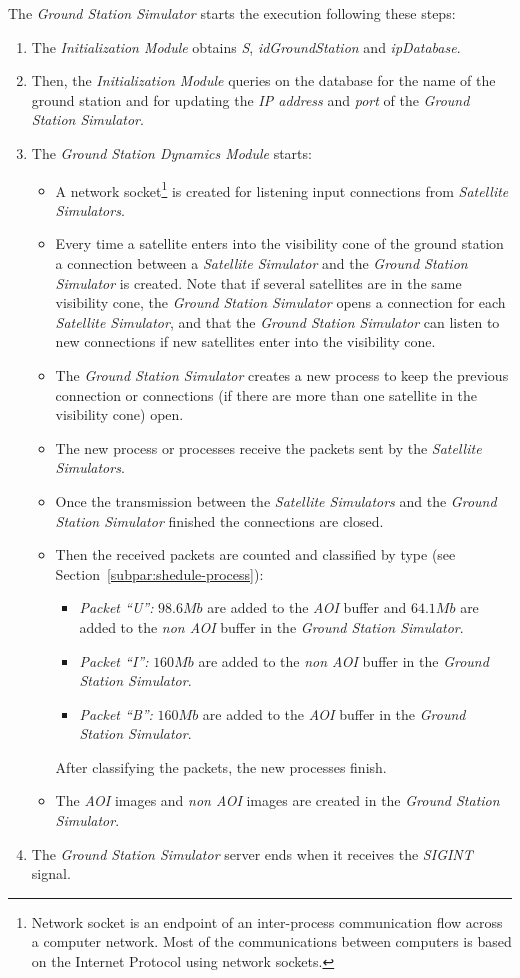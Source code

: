The \emph{Ground Station Simulator} starts the execution following these steps:
\begin{enumerate}
\item The \emph{Initialization Module} obtains \emph{S}, \emph{idGroundStation} and \emph{ipDatabase}.
\item Then, the \emph{Initialization Module} queries on the database for the
  name of the ground station and for updating the \emph{IP address} and
  \emph{port} of the \emph{Ground Station Simulator}.
\item The \emph{Ground Station Dynamics Module} starts:
\begin{itemize}
\item A network socket\footnote{Network socket is an endpoint of an inter-process communication flow across a computer network. Most of the communications between computers is based on the Internet Protocol using network sockets.}  is created for listening input connections from \emph{Satellite Simulators}.
\item Every time a satellite enters into the visibility cone of the ground station a connection between a \emph{Satellite Simulator} and the \emph{Ground Station Simulator} is created. Note that if several satellites are in the same visibility cone, the \emph{Ground Station Simulator} opens a connection for each \emph{Satellite Simulator}, and that the \emph{Ground Station Simulator} can listen to new connections if new satellites enter into the visibility cone.
\item The \emph{Ground Station Simulator} creates a new process to keep the previous connection or connections (if there are more than one satellite in the visibility cone) open.
\item The new process or processes receive the packets sent by the \emph{Satellite Simulators}.
\item Once the transmission between the \emph{Satellite Simulators} and the \emph{Ground Station Simulator} finished the connections are closed.
\item Then the received packets are counted and classified by type (see Section~\ref{subpar:shedule-process}):
\begin{itemize}
\item \emph{Packet ``U'':} $98.6Mb$ are added to the \emph{AOI} buffer and $64.1Mb$ are added to the \emph{non AOI} buffer in the \emph{Ground Station Simulator}.
\item \emph{Packet ``I'':} $160 Mb$ are added to the \emph{non AOI} buffer in the \emph{Ground Station Simulator}.
\item \emph{Packet ``B'':} $160 Mb$ are added to the \emph{AOI} buffer in the
  \emph{Ground   Station Simulator}.
\end{itemize}
After classifying the packets, the new processes finish.
\item The \emph{AOI} images and \emph{non AOI} images are created in the \emph{Ground Station  Simulator}.
\end{itemize}
\item The \emph{Ground Station Simulator} server ends when it receives the \emph{SIGINT} signal.
\end{enumerate}

